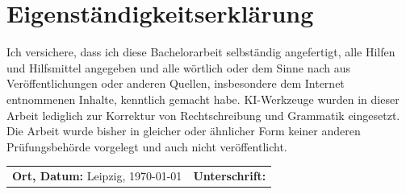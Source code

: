\section*{Eigenständigkeitserklärung}
\label{sec:eigenstaendigkeitserklaerung}

Ich versichere, dass ich diese Bachelorarbeit selbständig angefertigt, alle Hilfen und Hilfsmittel angegeben und alle
wörtlich oder dem Sinne nach aus Veröffentlichungen oder anderen Quellen, insbesondere dem Internet entnommenen
Inhalte, kenntlich gemacht habe. KI-Werkzeuge wurden in dieser Arbeit lediglich zur Korrektur von Rechtschreibung und Grammatik eingesetzt. 
Die Arbeit wurde bisher in gleicher oder ähnlicher Form keiner anderen Prüfungsbehörde vorgelegt und auch nicht veröffentlicht.

\vspace{2cm}

\noindent
\begin{tabular}{@{}p{}p{}@{}}
\textbf{Ort, Datum:} Leipzig, \today & \textbf{Unterschrift:} \hrulefill \\
\end{tabular}
